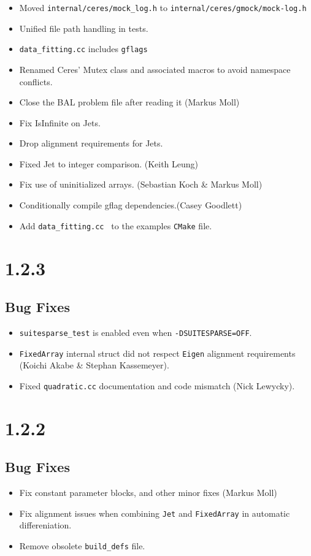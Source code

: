 \begin{itemize}
\item Moved \texttt{internal/ceres/mock\_log.h} to \texttt{internal/ceres/gmock/mock-log.h}
\item Unified file path handling in tests.
\item \texttt{data\_fitting.cc} includes \texttt{gflags}
\item Renamed Ceres' Mutex class and associated macros to avoid
  namespace conflicts.
\item Close the BAL problem file after reading it (Markus Moll)
\item Fix IsInfinite on Jets.
\item Drop alignment requirements for Jets.
\item Fixed Jet to integer comparison. (Keith Leung)
\item Fix use of uninitialized arrays. (Sebastian Koch \& Markus Moll)
\item Conditionally compile gflag dependencies.(Casey Goodlett)
\item Add \texttt{data\_fitting.cc } to the examples \texttt{CMake} file.
\end{itemize}

\section*{1.2.3}
\subsection{Bug Fixes}
\begin{itemize}
\item \texttt{suitesparse\_test} is enabled even when \texttt{-DSUITESPARSE=OFF}.
\item \texttt{FixedArray} internal struct did not respect \texttt{Eigen}
  alignment requirements (Koichi Akabe \& Stephan Kassemeyer).
\item Fixed \texttt{quadratic.cc} documentation and code mismatch
  (Nick Lewycky).
\end{itemize}
\section*{1.2.2}
\subsection{Bug Fixes}
\begin{itemize}
\item Fix constant parameter blocks, and other minor fixes (Markus Moll)
\item Fix alignment issues when combining \texttt{Jet} and
  \texttt{FixedArray} in automatic differeniation.
\item Remove obsolete \texttt{build\_defs} file.
\end{itemize}
